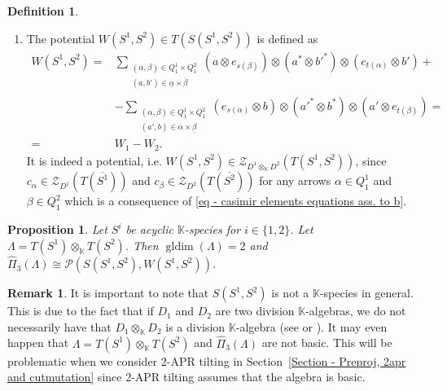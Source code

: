 \documentclass[a4paper, reqno]{amsart}
\newtheorem{myprop}[mythm]{Proposition}
\theoremstyle{definition}
\newtheorem{mydef}[mythm]{Definition}
\newtheorem{myrem}[mythm]{Remark}
\newcommand{\K}{\mathbb{K}}
\DeclareMathOperator{\gldim}{\mathrm{gldim}}
\begin{document}
\begin{mydef}
\begin{enumerate}
\begin{equation*}
		\end{equation*}
		\item The potential $W(S^1, S^2)\in T(S(S^1, S^2))$ is defined as
		\begin{equation}\label{eq - potential for tensor species}
			\begin{aligned}
				W(S^1, S^2) =& \sum_{\substack{(\alpha, \beta)\in Q_1^1\times Q_1^2 \\ (a, b')\in \underline{\alpha}\times \overline{\beta}}} (a\otimes e_{s(\beta)})\otimes(a^*\otimes {b'}^*)\otimes(e_{t(\alpha)}\otimes b') + \\
				&-\sum_{\substack{(\alpha, \beta)\in Q_1^1\times Q_1^2 \\ (a', b)\in \overline{\alpha}\times \underline{\beta}}} (e_{s(\alpha)}\otimes b)\otimes({a'}^*\otimes b^*)\otimes(a'\otimes e_{t(\beta)}) = \\
				=& W_1 - W_2.
			\end{aligned}
		\end{equation}
		It is indeed a potential, i.e. $W(S^1, S^2)\in \mathcal{Z}_{D^1\otimes_\K D^2}(T(S^1, S^2))$, since $c_\alpha\in \mathcal{Z}_{D^1}(T(\overline{S^1}))$ and $c_\beta\in \mathcal{Z}_{D^2}(T(\overline{S^2}))$ for any arrows $\alpha\in Q_1^1$ and $\beta\in Q_1^2$ which is a consequence of \eqref{eq - casimir elements equations ass. to b}.
	\end{enumerate}
\end{mydef}

\begin{myprop}\label{proposition - preprojective algebra of tensor species}\cite[Proposition 3.33]{soderberg2024mutation}
	Let $S^i$ be acyclic $\K$-species for $i\in \{1, 2\}$. Let $\Lambda = T(S^1)\otimes_\K T(S^2)$. Then $\gldim(\Lambda) = 2$ and $\widehat{\Pi}_3(\Lambda) \cong \mathcal{P}(S(S^1, S^2), W(S^1, S^2))$.
\end{myprop}

\begin{myrem}
	It is important to note that $S(S^1, S^2)$ is not a $\K$-species in general. This is due to the fact that if $D_1$ and $D_2$ are two division $\K$-algebras, we do not necessarily have that $D_1\otimes_\K D_2$ is a division $\K$-algebra (see \cite[Remark~3.31]{soderberg2024mutation} or \cite[Remark~11.6]{soderberg2022preprojective}). It may even happen that $\Lambda = T(S^1)\otimes_\K T(S^2)$ and $\widehat{\Pi}_3(\Lambda)$ are not basic. This will be problematic when we consider $2$-APR tilting in Section~\ref{Section - Preproj, 2apr and cutmutation} since $2$-APR tilting assumes that the algebra is basic.
\end{myrem}
\end{document}
